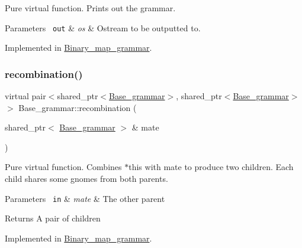 Pure virtual function. Prints out the grammar. 


\begin{DoxyParams}[1]{Parameters}
\mbox{\texttt{ out}}  & {\em os} & Ostream to be outputted to. \\
\hline
\end{DoxyParams}


Implemented in \mbox{\hyperlink{classBinary__map__grammar_a2c96df3dd0ae512c4de573e1e1cd63e5}{Binary\+\_\+map\+\_\+grammar}}.

\mbox{\label{classBase__grammar_a60e0296e1254df779af8be718d465696}} 
\subsubsection{\texorpdfstring{recombination()}{recombination()}}
{\footnotesize\ttfamily virtual pair$<$shared\+\_\+ptr$<$\mbox{\hyperlink{classBase__grammar}{Base\+\_\+grammar}}$>$, shared\+\_\+ptr$<$\mbox{\hyperlink{classBase__grammar}{Base\+\_\+grammar}}$>$ $>$ Base\+\_\+grammar\+::recombination (\begin{DoxyParamCaption}\item[{shared\+\_\+ptr$<$ \mbox{\hyperlink{classBase__grammar}{Base\+\_\+grammar}} $>$ \&}]{mate }\end{DoxyParamCaption})\hspace{0.3cm}{\ttfamily [pure virtual]}}



Pure virtual function. Combines $\ast$this with mate to produce two children. Each child shares some gnomes from both parents. 


\begin{DoxyParams}[1]{Parameters}
\mbox{\texttt{ in}}  & {\em mate} & The other parent \\
\hline
\end{DoxyParams}
\begin{DoxyReturn}{Returns}
A pair of children 
\end{DoxyReturn}


Implemented in \mbox{\hyperlink{classBinary__map__grammar_a81761711a54269d1a48e196eaa3fe9e4}{Binary\+\_\+map\+\_\+grammar}}.

\mbox{\label{classBase__grammar_a7fdb4f3880b7cba62638bc722c1ad644}} 
